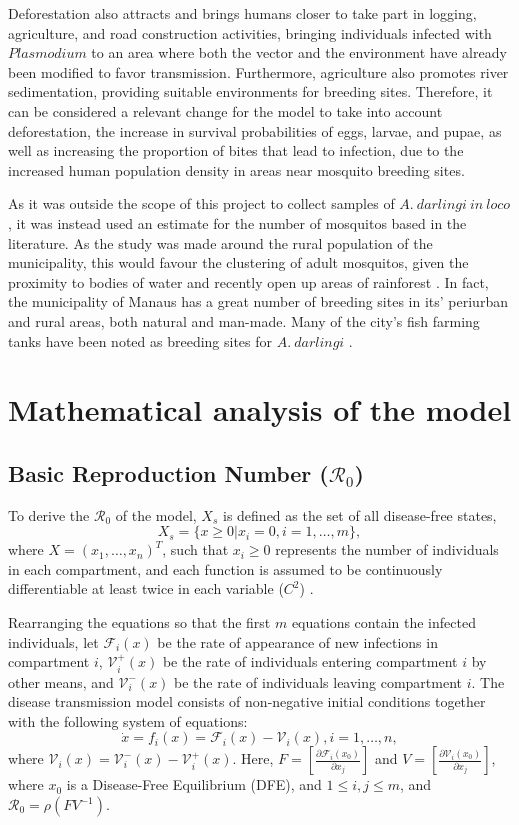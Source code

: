 \documentclass[a4paper,fleqn]{cas-dc}
\begin{document}
Deforestation also attracts and brings humans closer 
to take part in logging, agriculture, and road construction 
activities, bringing individuals infected with $Plasmodium$ to 
an area where both the vector and the environment have already 
been modified to favor transmission. Furthermore, agriculture 
also promotes river sedimentation, providing suitable environments 
for breeding sites. Therefore, it can be considered a relevant 
change for the model to take into account deforestation, the 
increase in survival probabilities of eggs, larvae, and pupae, 
as well as increasing the proportion of bites that lead to infection, 
due to the increased human population density in areas near mosquito 
breeding sites.

As it was outside the scope of this project to collect samples of $A. \ darlingi \ in \ loco$, it was instead used 
an estimate for the number of mosquitos based in the literature. As the study was made around the rural population of the municipality,
this would favour the clustering of adult mosquitos, given the proximity to bodies of water and recently open up areas of rainforest \cite{Biological_Variation_Anopheles}. 
In fact, the municipality of Manaus has a great number of breeding sites in its' periurban and rural areas, both natural and man-made. Many of the city's fish farming tanks 
have been noted as breeding sites for $A. \ darlingi$ \cite{Abundancia_Larval}.

\section{Mathematical analysis of the model}

\subsection{Basic Reproduction Number ($\mathcal{R}_0$)}
To derive the $\mathcal{R}_0$ of the model, $X_s$ is defined as the set of all disease-free states, 
$$X_s=\{x \geq 0|x_i=0, i=1,\ldots,m\},$$
where $X=(x_1,\ldots, x_n)^T$, such that $x_i\geq 0$ represents the number 
of individuals in each compartment, and each function is assumed to be 
continuously differentiable at least twice in each variable ($C^2$) \cite{Rep_Number_Comp_Model}.

Rearranging the equations so that the first $m$ equations 
contain the infected individuals, let ${\mathcal F}_i(x)$ be the 
rate of appearance of new infections in compartment $i$, 
${\mathcal V}_i^+(x)$ be the rate of individuals entering 
compartment $i$ by other means, and ${\mathcal V}_i^-(x)$ 
be the rate of individuals leaving compartment $i$. The disease 
transmission model consists of non-negative initial conditions 
together with the following system of equations:
$$\dot{x}=f_i(x)={\mathcal F}_i(x)-{\mathcal V}_i(x), i=1,\ldots, n,$$
where ${\mathcal V}_i (x) = {\mathcal V}_i^{-}(x) - {\mathcal V}_i^+(x)$. 
Here, 
$F=\left[\frac{\partial {\mathcal F}_i (x_0)}{\partial x_j}\right]$ 
and $V=\left[\frac{\partial {\mathcal V}_i (x_0) }{\partial x_j}\right]$, 
where $x_0$ is a Disease-Free Equilibrium (DFE), and $1\leq i,j \leq m$, and $\mathcal{R}_0 = \rho(FV^{-1})$. 
\end{document}
